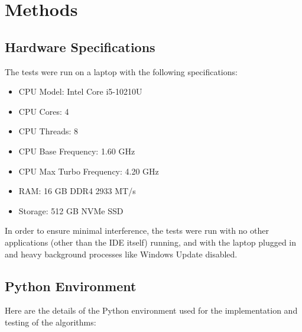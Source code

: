 \chapter{Methods}

\section{Hardware Specifications}
The tests were run on a laptop with the following specifications:
\begin{itemize}
    \item CPU Model: Intel Core i5-10210U
    \item CPU Cores: 4\cite{intel}
    \item CPU Threads: 8\cite{intel}
    \item CPU Base Frequency: 1.60 GHz\cite{intel}
    \item CPU Max Turbo Frequency: 4.20 GHz\cite{intel}
    \item RAM: 16 GB DDR4 2933 MT/s
    \item Storage: 512 GB NVMe SSD
\end{itemize}
In order to ensure minimal interference, the tests were run with no other applications (other than the IDE itself) running, 
and with the laptop plugged in and heavy background processes like Windows Update disabled.

\section{Python Environment}
Here are the details of the Python environment used for the implementation and testing of the algorithms:

